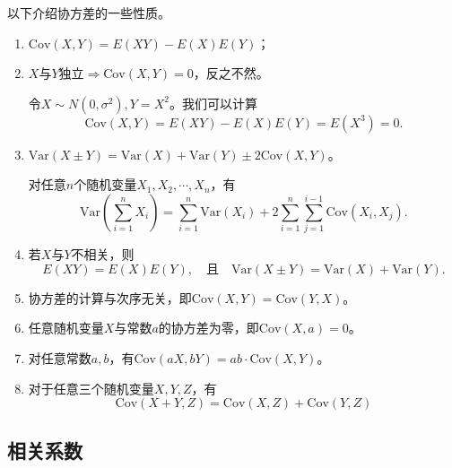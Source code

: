 以下介绍协方差的一些性质。
\begin{property}
\begin{enumerate}
    \item $ \text{Cov}(X,Y)=E(XY)-E(X)E(Y)$；
    
    \item $X$与$Y$独立$\Rightarrow \text{Cov}(X,Y)=0$，反之不然。
    \begin{remark}
        令$X\sim N(0,\sigma^{2}),Y=X^{2}$。我们可以计算
        $$
        \text{Cov}(X,Y) = E(XY) - E(X)E(Y) = E(X^3) = 0.
        $$
    \end{remark}
    
    \item $\text{Var}(X \pm Y)= \text{Var}(X)+\text{Var}(Y) \pm 2\text{Cov}(X, Y)$。
    \begin{remark}
        对任意$n$个随机变量$X_{1},X_{2},\cdots,X_{n}$，有$$\text{Var}\left(\sum_{i=1}^{n} X_{i}\right)=\sum_{i=1}^{n} \text{Var}\left(X_{i}\right)+2 \sum_{i=1}^{n} \sum_{j=1}^{i-1} \text{Cov}\left(X_{i}, X_{j}\right).$$
    \end{remark}
    \item 若$X$与$Y$不相关，则
    $$E(X Y)=E(X)E(Y), \quad \text{且}\quad  \text{Var}(X \pm Y)= \text{Var}(X)+\text{Var}(Y).$$
    \item 协方差的计算与次序无关，即$\text{Cov}(X,Y)=\text{Cov}(Y,X)$。
    
    \item 任意随机变量$X$与常数$a$的协方差为零，即$\text{Cov}(X,a)=0$。
    
    \item 对任意常数$a,b$，有$\text{Cov}(aX,bY)=ab\cdot \text{Cov}(X,Y)$。
    
    \item 对于任意三个随机变量$X,Y,Z$，有$$\text{Cov}(X+Y, Z)=\text{Cov}(X, Z)+\text{Cov}(Y, Z)$$
\end{enumerate}
\end{property}
\subsection{相关系数}

